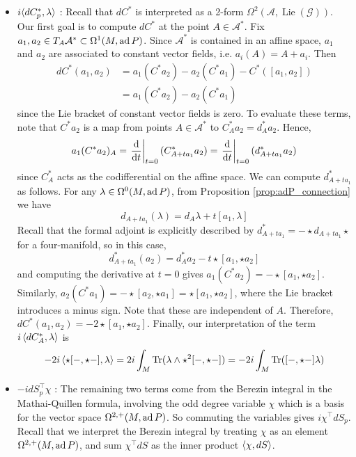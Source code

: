 \begin{itemize}[leftmargin=\parindent]
	\item  
$i\gen[*]{dC^*_p,\lambda}$ : Recall that $dC^*$ is interpreted as a 2-form 
$\Omega^2(\mathcal{A},\operatorname{Lie}(\mathcal{G}))$. Our first goal is to
compute $dC^*$ at the point $A \in \mathcal{A}^*$. 
Fix $a_1,a_2\in T_A \mathcal{A}^* \subset \Omega^1(M, \operatorname{ad} P)$. 
Since $\mathcal{A}^*$ is contained in an affine space, 
$a_1$ and $a_2$ are associated to constant vector fields, i.e.
$a_i(A)=A+a_i$. Then 
\begin{align*}
	dC^*(a_1,a_2) 
	&= a_1(C^*a_2) - a_2(C^*a_1) - C^*([a_1,a_2]) \\
	&= a_1(C^*a_2) - a_2(C^*a_1) 
\end{align*}
since the Lie bracket of constant vector fields is zero. To evaluate these
terms, note that $C^*a_2$ is a map from points $A\in \mathcal{A}^*$ to 
$C^*_Aa_2 = d^*_Aa_2$. Hence,
\begin{align*}
	a_1(C^*a_2)_A 
	= \odv{}{t}_{t=0}(C^*_{A+ta_1}a_2) 
	= \odv{}{t}_{t=0}(d^*_{A+ta_1}a_2) 
\end{align*}
since $C_A^*$ acts as the codifferential on the affine space. 
We can compute $d^*_{A+ta_1}$ as follows. 
For any $\lambda \in \Omega^0(M,\operatorname{ad} P)$, from Proposition \ref{prop:adP_connection}
we have
\[
	d_{A+ta_1}(\lambda) = d_A\lambda + t[a_1,\lambda]
\] 
Recall that the formal adjoint is explicitly described by 
$d^*_{A+ta_1} = -\star d_{A+ta_1} \star$ for a four-manifold, so in this case,
\[
	d^*_{A+ta_1}(a_2) = d^*_A a_2 - t \star [a_1,\star a_2]
\] 
and computing the derivative at $t=0$ gives
$a_1(C^*a_2) = -\star [a_1, \star a_2]$. Similarly, 
$a_2(C^*a_1) = -\star [a_2, \star a_1] = \star [a_1, \star a_2]$, 
where the Lie bracket introduces a minus sign. 
Note that these are independent of $A$. 
Therefore, $dC^*(a_1,a_2) = -2 \star [a_1,\star a_2]$.
Finally, our interpretation of the term $i\gen{dC^*_A,\lambda}$ is 
\[
-2i \gen{\star[-,\star -], \lambda}
= 2i \int_M \Tr(\lambda \wedge \star^2[-,\star -] )
= -2i \int_M \Tr( [-,\star -]\lambda )
\] 

	\item 
$-idS^\intercal_p \chi$ : The remaining two terms come from the Berezin integral
in the Mathai-Quillen formula, involving the odd degree
variable $\chi$ which is a basis for the vector space $\Omega^{2,+}(M,\operatorname{ad} P)$.
So commuting the variables gives $i \chi^{\intercal} dS_p$.
Recall that we interpret the Berezin integral by treating $\chi$ as an element 
$\Omega^{2,+}(M,\operatorname{ad} P)$, and 
sum $\chi^\intercal dS$ as the inner product $\gen{\chi,dS}$.


\end{itemize}
